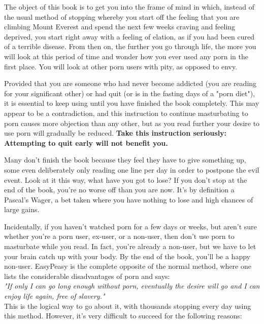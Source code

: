 \documentclass[easypeasy.tex]{subfiles}
\begin{document}
The object of this book is to get you into the frame of mind in which, instead of the usual method of stopping whereby you start off the feeling that you are climbing Mount Everest and spend the next few weeks craving and feeling deprived, you start right away with a feeling of elation, as if you had been cured of a terrible disease. From then on, the further you go through life, the more you will look at this period of time and wonder how you ever used any porn in the first place. You will look at other porn users with pity, as opposed to envy.

Provided that you are someone who had never become addicted (you are reading for your significant other) or had quit (or is in the fasting days of a "porn diet"), it is essential to keep using until you have finished the book completely. This may appear to be a contradiction, and this instruction to continue masturbating to porn causes more objection than any other, but as you read further your desire to use porn will gradually be reduced. \textbf{Take this instruction seriously: Attempting to quit early will not benefit you.}

Many don't finish the book because they feel they have to give something up, some even deliberately only reading one line per day in order to postpone the evil event. Look at it this way, what have you got to lose? If you don't stop at the end of the book, you're no worse off than you are now. It's by definition a Pascal's Wager, a bet taken where you have nothing to lose and high chances of large gains.

Incidentally, if you haven't watched porn for a few days or weeks, but aren't sure whether you're a porn user, ex-user, or a non-user, then don't use porn to masturbate while you read. In fact, you're already a non-user, but we have to let your brain catch up with your body. By the end of the book, you'll be a happy non-user. EasyPeasy is the complete opposite of the normal method, where one lists the considerable disadvantages of porn and says: \\
\textit{"If only I can go long enough without porn, eventually the desire will go and I can enjoy life again, free of slavery."} \\
This is the logical way to go about it, with thousands stopping every day using this method. However, it's very difficult to succeed for the following reasons:
\end{document}

